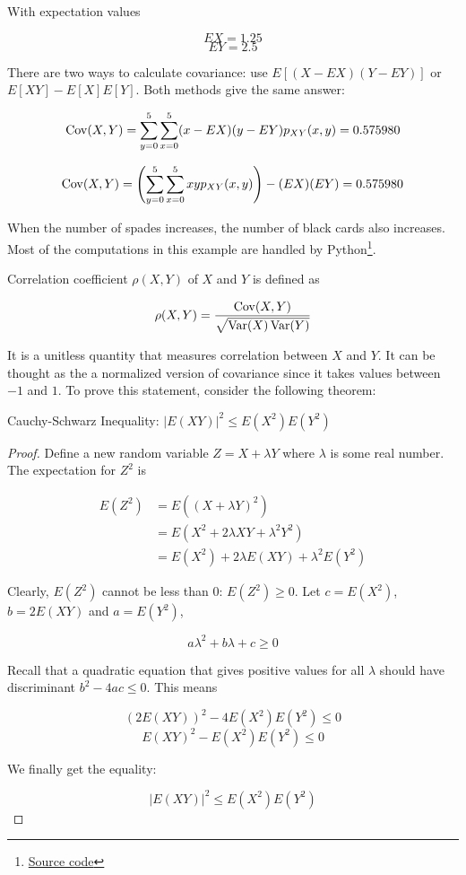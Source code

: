 \begin{texample}
	With expectation values
	
	\[EX=1.25\]
	\[EY=2.5\]
	
	There are two ways to calculate covariance: use $E[(X-EX)(Y-EY)]$ or $E[XY]-E[X]E[Y]$. Both methods give the same answer:
	
	\[\operatorname{Cov}(X,Y)=\sum_{y=0}^5\sum_{x=0}^5 (x-EX)(y-EY) p_{XY}(x,y)=0.575980\]
	
	\[\operatorname{Cov}(X,Y)=\left( \sum_{y=0}^5\sum_{x=0}^5 xyp_{XY}(x,y) \right)-(EX)(EY)=0.575980\]
	
	When the number of spades increases, the number of black cards also increases. \\
	
	Most of the computations in this example are handled by Python\footnote{\href{https://gist.github.com/marethyu/777e372c69cb356c5fc8c93f59cf62e6}{Source code}}.
\end{texample}

Correlation coefficient $\rho(X,Y)$ of $X$ and $Y$ is defined as

\[\rho(X,Y)=\frac{\operatorname{Cov}(X,Y)}{\sqrt{\operatorname{Var}(X)\operatorname{Var}(Y)}}\]

It is a unitless quantity that measures correlation between $X$ and $Y$. It can be thought as the a normalized version of covariance since it takes values between $-1$ and $1$. To prove this statement, consider the following theorem:

\begin{theorem}
	Cauchy-Schwarz Inequality: $|E(XY)|^2 \le E(X^2)E(Y^2)$
\end{theorem}

\begin{proof}
	Define a new random variable $Z=X+\lambda Y$ where $\lambda$ is some real number. \\
	
	The expectation for $Z^2$ is
	
	\begin{align*}
		E(Z^2)&=E((X+\lambda Y)^2) \\
		&=E(X^2+2\lambda XY+\lambda^2Y^2) \\
		&=E(X^2)+2\lambda E(XY)+\lambda^2 E(Y^2)
	\end{align*}
	
	Clearly, $E(Z^2)$ cannot be less than 0: $E(Z^2)\ge0$. Let $c=E(X^2)$, $b=2E(XY)$ and $a=E(Y^2)$,
	
	\[ a\lambda^2+b\lambda+c\ge0 \]
	
	Recall that a quadratic equation that gives positive values for all $\lambda$ should have discriminant $b^2-4ac \le 0$. This means
	
	\[(2E(XY))^2-4E(X^2)E(Y^2)\le0\]
	\[E(XY)^2-E(X^2)E(Y^2)\le0\]
	
	We finally get the equality:
	
	\[|E(XY)|^2 \le E(X^2)E(Y^2)\]
	
\end{proof}

